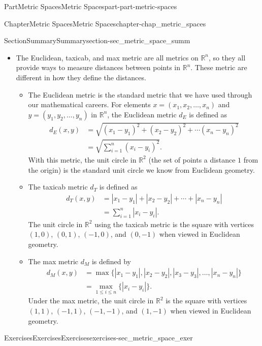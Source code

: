 \documentclass[oneside,10pt,]{book}
\numberwithin{equation}{chapter}
\newcommand{\R}{\mathbb{R}}
\newcommand{\amp}{&}
\begin{document}
\begin{partptx}{Part}{Metric Spaces}{}{Metric Spaces}{}{}{part-part-metric-spaces}
\begin{chapterptx}{Chapter}{Metric Spaces}{}{Metric Spaces}{}{}{chapter-chap_metric_spaces}
\begin{sectionptx}{Section}{Summary}{}{Summary}{}{}{section-sec_metric_space_summ}
\begin{itemize}[label=\textbullet]
\begin{enumerate}
\end{enumerate}
A metric space is any space combined with a metric defined on that space.%
\item{}The Euclidean, taxicab, and max metric are all metrics on \(\R^n\), so they all provide ways to measure distances between points in \(\R^n\). These metric are different in how they define the distances.%
\begin{itemize}[label=$\circ$]
\item{}The Euclidean metric is the standard metric that we have used through our mathematical careers. For elements \(x = (x_1, x_2, \ldots,
x_n)\) and \(y = (y_1, y_2, \ldots,
y_n)\) in \(\R^n\), the Euclidean metric \(d_E\) is defined as%
\begin{align*}
d_E(x,y) \amp =  \sqrt{(x_1-y_1)^2 + (x_2-y_2)^2 + \cdots (x_n-y_n)^2}\\
\amp = \sqrt{\sum_{i=1}^n (x_i-y_i)^2}\text{.}
\end{align*}
With this metric, the unit circle in \(\R^2\) (the set of points a distance \(1\) from the origin) is the standard unit circle we know from Euclidean geometry.%
\item{}The taxicab metric \(d_T\) is defined as%
\begin{align*}
d_T(x,y) \amp = |x_1-y_1| + |x_2-y_2| + \cdots + |x_n-y_n|\\
\amp = \sum_{i=1}^n |x_i-y_i|\text{.}
\end{align*}
The unit circle in \(\R^2\) using the taxicab metric is the square with vertices \((1,0)\), \((0,1)\), \((-1,0)\), and \((0,-1)\) when viewed in Euclidean geometry.%
\item{}The max metric \(d_M\) is defined by%
\begin{align*}
d_M(x,y) \amp = \max\{| x_1-y_1 |, | x_2-y_2 |, |x_3-y_3|, \ldots, |x_n-y_n| \}\\
\amp = \max_{1 \leq i \leq n} \{|x_i-y_i|\}\text{.}
\end{align*}
Under the max metric, the unit circle in \(\R^2\) is the square with vertices \((1,1)\), \((-1,1)\), \((-1,-1)\), and \((1,-1)\) when viewed in Euclidean geometry.%
\end{itemize}
%
\end{itemize}
%
\end{sectionptx}
%
%
\typeout{************************************************}
\typeout{************************************************}
%
\begin{exercises-section}{Exercises}{Exercises}{}{Exercises}{}{}{exercises-sec_metric_space_exer}

\end{exercises-section}
\end{chapterptx}
\end{partptx}
\end{document}
